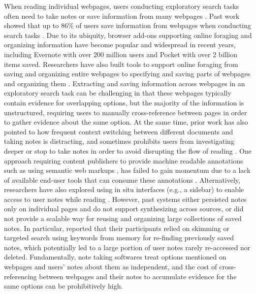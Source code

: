 When reading individual webpages, users conducting exploratory search tasks often need to take notes or save information from many webpages \cite{mar2006exp}. Past work showed that up to 86\% of users save information from webpages when conducting search tasks \cite{lee2012survey}. Due to its ubiquity, browser add-ons supporting online foraging and organizing information have become popular and widespread in recent years, including Evernote with over 200 million users and Pocket with over 2 billion items saved. Researchers have also built tools to support online foraging from saving and organizing entire webpages \cite{card1996webbook} to specifying and saving parts of webpages and organizing them \cite{dontcheva2006collecting, sugiura1998internet,zhu2002hunter,chang2016supporting}. Extracting and saving information across webpages in an exploratory search task can be challenging in that these webpages typically contain evidence for overlapping options, but the majority of the information is unstructured, requiring users to manually cross-reference between pages in order to gather evidence about the same option. At the same time, prior work has also pointed to how frequent context switching between different documents and taking notes is distracting, and sometimes prohibits users from investigating deeper or stop to take notes in order to avoid disrupting the flow of reading \cite{o1996towards,marshall1999introducing,tashman2011liquidtext,bianchi2015designing}. One approach requiring content publishers to provide machine readable annotations such as using semantic web markups \cite{berners2001publishing,berners2001weaving}, has failed to gain momentum due to a lack of available end-user tools that can consume these annotations \cite{whatwentwrong}. Alternatively, researchers have also explored using in situ interfaces (e.g., a sidebar) to enable access to user notes while reading \cite{tashman2011liquidtext,notetoself}. However, past systems either persisted notes only on individual pages and do not support synthesizing across sources, or did not provide a scalable way for reusing and organizing large collections of saved notes.  In particular, \cite{notetoself} reported that their participants relied on skimming or targeted search using keywords from memory for re-finding previously saved notes, which potentially led to a large portion of user notes rarely re-accessed nor deleted. Fundamentally, note taking softwares treat options mentioned on webpages and users' notes about them as independent, and the cost of cross-referencing between webpages and their notes to accumulate evidence for the same options can be prohibitively high.

